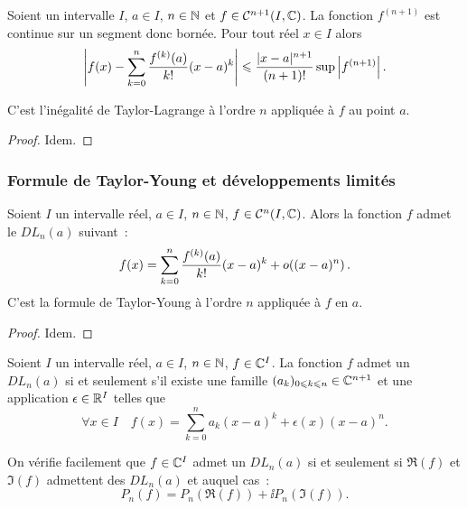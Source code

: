 \begin{theo}
  Soient un intervalle \(I\), \(a \in I\), \(n \in \mathbb{N}\) et \(f \in \mathcal{C}^{{n+1}} (I,\mathbb{C})\). La fonction \(f^{(n+1)}\) est continue sur un segment donc bornée. Pour tout réel \(x \in I\) alors
  \begin{equation}
    \left|f(x)-\sum_{k=0}^n \frac{f^{(k)}(a)}{k!}(x-a)^k\right| \leqslant \frac{|x-a|^{n+1}}{(n+1)!} \sup \left\lvert f^{(n+1)}\right\rvert.
  \end{equation}

C'est l'inégalité de Taylor-Lagrange à l'ordre \(n\) appliquée à \(f\) au point \(a\).
\end{theo}
\begin{proof}
  Idem.
\end{proof}

\subsubsection{Formule de Taylor-Young et développements limités}

\begin{theo}
  Soient \(I\) un intervalle réel, \(a \in I\), \(n \in \mathbb{N}\), \(f \in \mathcal{C}^{n}(I,\mathbb{C})\). Alors la fonction \(f\) admet le \(DL_n(a)\) suivant~:
  \begin{equation}
    f(x) = \sum_{k=0}^n \frac{f^{(k)}(a)}{k!} (x-a)^k + o\mathopen{}\left((x-a)^n\right).
  \end{equation}
  C'est la formule de Taylor-Young à l'ordre \(n\) appliquée à \(f\) en \(a\).
\end{theo}
\begin{proof}
  Idem.
\end{proof}

\begin{defdef}
  Soient \(I\) un intervalle réel, \(a \in I\), \(n \in \mathbb{N}\), \(f \in \mathbb{C}^I\). La fonction \(f\) admet un \(DL_n(a)\) si et seulement s'il existe une famille \((a_k)_{0\leqslant k\leqslant n} \in \mathbb{C}^{n+1}\) et une application \(\epsilon \in \mathbb{R}^I\) telles que
  \begin{equation}
    \forall x \in I \quad f(x)=\sum_{k=0}^n a_k (x-a)^k + \epsilon(x)(x-a)^n.
  \end{equation}
  
  On vérifie facilement que \(f\in \mathbb{C}^I\) admet un \(DL_n(a)\) si et seulement si \(\Re(f)\) et \(\Im(f)\) admettent des \(DL_n(a)\) et auquel cas~:
  \begin{equation}
    P_n(f) = P_n(\Re(f)) + \ii P_n(\Im(f)).
  \end{equation}  
\end{defdef}
